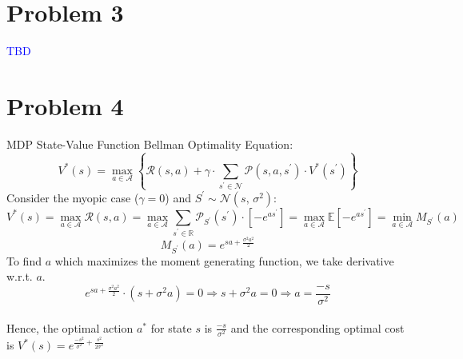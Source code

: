 \documentclass{article}
\begin{document}
\section*{Problem 3}
\textcolor{blue}{TBD}

\section*{Problem 4}
MDP State-Value Function Bellman Optimality Equation:
$$
V^{*}(s)=\max _{a \in \mathcal{A}}\left\{\mathcal{R}(s, a)+\gamma \cdot \sum_{s^{\prime} \in \mathcal{N}} \mathcal{P}\left(s, a, s^{\prime}\right) \cdot V^{*}\left(s^{\prime}\right)\right\}
$$
Consider the myopic case ($\gamma = 0$) and $S^{\prime}\sim \mathcal{N}(s,\,\sigma^{2})$:
$$
V^{*}(s)=\max _{a \in \mathcal{A}}\mathcal{R}(s, a) = \max _{a \in \mathcal{A}}\sum_{s^{\prime} \in \mathbb{R}} \mathcal{P}_{S^{\prime}}\left( s^{\prime}\right)\cdot [-e ^{as^{\prime}}] = \max _{a \in \mathcal{A}}\mathbb{E}[-e^{as^{\prime}}] = \min _{a \in \mathcal{A}} M_{S^{\prime}}(a)
$$
$$
 M_{S^{\prime}}(a)=e^{sa+\frac{\sigma^2 a^2}{2}}
$$
To find $a$ which maximizes the moment generating function, we take derivative w.r.t. $a$.\\
$$
 e^{sa+\frac{\sigma^2 a^2}{2}}\cdot (s + \sigma^2 a) = 0 \Longrightarrow s + \sigma^2 a = 0 \Longrightarrow a = \frac{-s}{\sigma^2}
$$\\
Hence, the optimal action $a^{*}$ for state $s$ is $\frac{-s}{\sigma^2}$ and the corresponding optimal cost is $V^{*}(s) = e^{\frac{-s^2}{\sigma^2} + \frac{s^2}{2\sigma^2}}$
\end{document}

